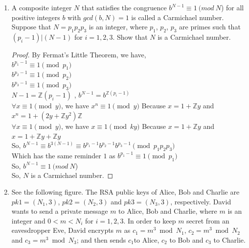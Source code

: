 \documentclass{article}
\theoremstyle{break}
\newtheorem*{solution*}{\textbf{Solution:} }
\begin{document}
\begin{enumerate}
$$\begin{aligned}
        x \equiv a_1 \pmod {11};\\
        x \equiv a_2 \pmod {13};\\
        x \equiv a_3 \pmod {17};\\
        x \equiv a_4 \pmod {19};\\
\end{aligned}
\right.
$$
\begin{solution*}
$n = 11 \cdot 13 \cdot 17 \cdot 19 = 46189$\\
$m_1 = 4199 \quad m_2 = 3553 \quad m_3 = 2717 \quad m_4 =2413$\\
$m_1^{-1}  = 7  \quad m_2^{-1} = 10 \quad m_3^{-1} = 11 \quad m_4^{-1} = 18$ \\
$c_1 = 29392 \quad c_2 = 35530 \quad c_3 = 29887  \quad c_4 =  43758$ \\
$a = \sum_{i=1}^{4} a_i c_i  \pmod n= 29392a_1 + 35530a_2 + 29887a_3 +  43758a_4 \pmod{ 46189}$\\
$x \in [29392a_1 + 35530a_2 + 29887a_3 +  43758a_4 ]_{46189} $
\end{solution*}
\item 
A composite integer $N$ that satisfies the congruence $b^{N−1} \equiv  1 \ (mod \ N$) for all positive 
integers $b$ with $gcd(b,N) = 1 $ is called a Carmichael number.  Suppose that $N=p_1p_2p_3$ is an integer, 
where $p_1$, $p_2$, $p_3$ are primes such that $(p_i−1)|(N−1)$ for $i= 1,2,3$.  Show that $N$ is a Carmichael number. 
\begin{proof}
By Fermat's Little Theorem, we have, \\
$b^{p_1-1}  \equiv 1 \pmod {p_1}$ \\
$b^{p_2-1}  \equiv 1 \pmod {p_2}$ \\
$b^{p_3-1}  \equiv 1 \pmod {p_3}$ \\
$N -1= \mathbb{Z}(p_i-1)$ , $b^{N-1} = b^{\mathbb{Z}(p_i-1)}$\\
$\forall x \equiv 1 \pmod{y}$, we have $x^n \equiv 1 \pmod{y}$ Because $x = 1 + \mathbb{Z}y$ and $x^n = 1 + (2y + \mathbb{Z} y^2)\mathbb{Z}$\\
$\forall x \equiv 1 \pmod y $, we have $x \equiv  1 \pmod{ ky}$ Because $x = 1 + \mathbb{Z}y$ and $x = 1 + \mathbb{Z}y +  \mathbb{Z}y$ \\
So, $b^{N-1} \equiv b^{3(N-1)} \equiv b^{p_1-1}b^{p_2-1}b^{p_3-1} \pmod{p_1p_2p_3}  $\\
Which has the same reminder $1$ as $b^{p_1-1}  \equiv 1 \pmod {p_1}$ \\
So, $b^{N−1} \equiv  1 \ (mod \ N$) \\
So, $N$ is a Carmichael number. 
\end{proof}
\newpage
\item 
See the following figure.  The RSA public keys of Alice, Bob and Charlie are $pk1=(N_1,3)$,
$pk2= (N_2,3)$ and $pk3= (N_3,3)$, respectively.  David wants to send a private message $m$ to Alice, 
Bob and Charlie, where $m$ is an integer and $0< m < N_i$ for $i= 1,2,3$.  In order to keep $m$ secret from
 an eavesdropper Eve, David encrypts $m$ as $ c_1=m^3 \bmod N_1$, $c_2=m^3 \bmod N_2$ and $c_3=m^3 \bmod N_3$; 
 and then sends $c_1$to Alice, $c_2$ to Bob and $c_3$ to Charlie. 


\end{enumerate}
\end{document}
